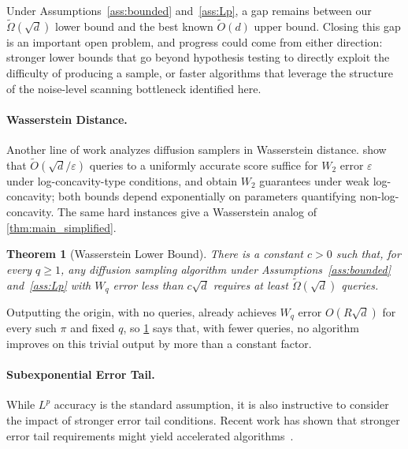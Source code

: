 \documentclass[11pt,letterpaper]{article}
\newtheorem{theorem}{Theorem}[section]
\newcommand{\1}{\mathbbm{1}}
\begin{document}
Under Assumptions~\ref{ass:bounded} and~\ref{ass:Lp}, a gap
remains between our $\widetilde\Omega(\sqrt{d})$ lower bound and
the best known $\widetilde O(d)$ upper bound.
Closing this gap is an important open problem, and progress could
come from either direction: stronger lower bounds that go beyond
hypothesis testing to directly exploit the difficulty of producing
a sample, or faster algorithms that leverage the structure of the
noise-level scanning bottleneck identified here.

\paragraph{Wasserstein Distance.}
Another line of work analyzes diffusion samplers in Wasserstein distance.
\cite{arsenyan2025wasserstein} show that $\widetilde O(\sqrt d/\varepsilon)$
queries to a uniformly accurate score suffice for $W_2$ error $\varepsilon$
under log-concavity-type conditions, and \cite{gentilonisilveri2025beyond}
obtain $W_2$ guarantees under weak log-concavity; both bounds depend
exponentially on parameters quantifying non-log-concavity.
The same hard instances give a Wasserstein analog of \cref{thm:main_simplified}.

\begin{theorem}[Wasserstein Lower Bound]
  \label{thm:wasserstein_simplified}
  There is a constant $c>0$ such that, for every $q\ge1$, any
  diffusion sampling algorithm under Assumptions~\ref{ass:bounded}
  and~\ref{ass:Lp} with $W_q$ error less than $c\sqrt d$ requires at least
  $\widetilde\Omega(\sqrt d)$ queries.
\end{theorem}

Outputting the origin, with no queries, already achieves $W_q$ error
$O(R\sqrt d)$ for every such $\pi$ and fixed $q$, so
\cref{thm:wasserstein_simplified} says that, with fewer queries, no
algorithm improves on this trivial output by more than a constant factor.





\paragraph{Subexponential  Error Tail.}
While $L^p$ accuracy is the standard assumption, it is also instructive to consider the impact of stronger error tail conditions. Recent work has shown that stronger error tail requirements might yield accelerated algorithms~\citep{gatmiry2026highaccuracy}.
\end{document}
